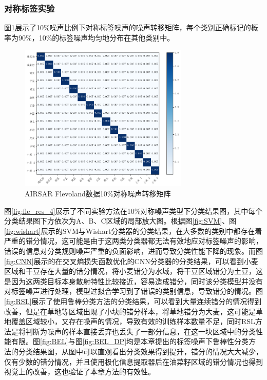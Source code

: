 \subsubsection{对称标签实验}
图\ref{fig:fle_noise_uniform}展示了10\%噪声比例下对称标签噪声的噪声转移矩阵，每个类别正确标记的概率为90\%，10\%的标签噪声均匀地分布在其他类别中。
\begin{figure}[h]
    \centering
    \includegraphics[width=8.04cm]{pic/chapter4/fle/noise_uniform.png}
    \caption{AIRSAR Flevoland数据10\%对称噪声转移矩阵}
    \label{fig:fle_noise_uniform}
\end{figure}

图\ref{fig:fle_res_4}展示了不同实验方法在10\%对称噪声类型下分类结果图，其中每个分类结果图下方依次为A、B、C区域的局部放大图。根据图\ref{fig:SVM}、图\ref{fig:wishart}展示的SVM与Wishart分类器的分类结果，在大多数的类别中都存在着严重的错分情况，这可能是由于这两类分类器都无法有效地应对标签噪声的影响，错误的信息对分类规则噪声严重的负面影响，进而导致分类性能下降的现象。而图\ref{fig:CNN}展示的在交叉熵损失函数优化的CNN分类器的分类结果，可以看到小麦区域和干豆存在大量的错分情况，将小麦错分为水域，将干豆区域错分为土豆，这是因为这两类目标本身散射特性比较接近，容易造成错分，同时该分类模型并没有对标签噪声进行处理，模型过拟合学习到了错误的类别信息，导致错分的情况。图\ref{fig:RSL}展示了使用鲁棒分类方法的分类结果，可以看到大量连续错分的情况得到改善，但是在草地等区域出现了小块的错分样本，将草地错分为大麦，这可能是草地覆盖区域较小，又存在噪声的情况，导致有效的训练样本数量不足，同时RSL方法是将判断为噪声的样本直接丢弃也丢失了一部分信息，在这一块区域中的分类性能有限。图\ref{fig:BEL}与图\ref{fig:BEL_DP}均是本章提出的标签噪声下鲁棒性分类方法的分类结果图，从图中可以直观看出分类效果得到提升，错分的情况大大减少，仅有少数的错分情况，并且使用极化信息提取器后在油菜籽区域的错分情况也得到视觉上的改善，这也验证了本章方法的有效性。

